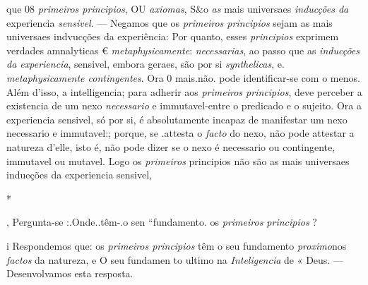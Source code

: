 que 08 \emph{primeiros principios}, OU \emph{axiomas}, S\&o \emph{as} mais universaes \emph{inducções da} experiencia \emph{sensivel}. --- Negamos que os \emph{primeiros principios} sejam as mais universaes indvucções da experiência: Por quanto, esses \emph{principios} exprimem verdades amnalyticas € \emph{metaphysicamente}: \emph{necessarias}, ao passo que as \emph{inducções da experiencia}, sensivel, embora geraes, são por si \emph{synthelicas}, e. \emph{metaphysicamente contingentes}. Ora 0 mais.não. pode identificar-se com o menos. Além d'isso, a intelligencia; para adherir aos \emph{primeiros principios}, deve perceber a existencia de um nexo \emph{necessario} e immutavel-entre o predicado e o sujeito. Ora a experiencia sensivel, só por si, é absolutamente incapaz de manifestar um nexo necessario e immutavel:; porque, se .attesta o \emph{facto} do nexo, não pode attestar a natureza d'elle, isto é, não pode dizer se o nexo é necessario ou contingente, immutavel ou mutavel. Logo os \emph{primeiros} principios não são as mais universaes indueções da experiencia sensivel,

*

, Pergunta-se :.Onde..têm-.o sen “fundamento. os \emph{primeiros principios} ?

i Respondemos que: os \emph{primeiros principios} têm o seu fundamento \emph{proximo}\textbar{}nos \emph{factos} da natureza, e O seu fundamen to ultimo na \emph{Inteligencia} de « Deus. --- Desenvolvamos esta resposta.

